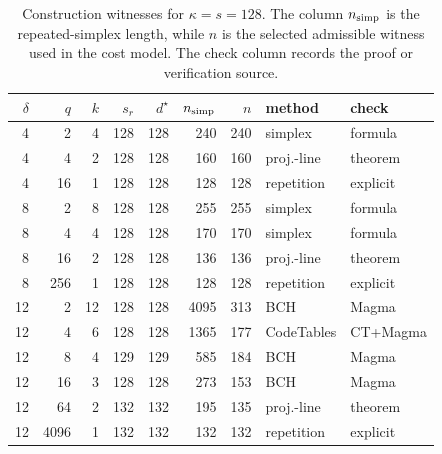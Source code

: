 \begin{table}
\centering
\small
\caption{Construction witnesses for $\kappa=s=128$. The column $n_{\rm simp}$ is the repeated-simplex length, while $n$ is the selected admissible witness used in the cost model. The check column records the proof or verification source.}
\label{tab:construction-witnesses}
\begingroup
\setlength{\tabcolsep}{3pt}
\begin{tabular}{rrrrrrrll}
\toprule
$\delta$ & $q$ & $k$ & $s_r$ & $d^\star$ & $n_{\rm simp}$ & $n$ & method & check \\
\midrule
4 & 2 & 4 & 128 & 128 & 240 & 240 & simplex & formula \\
4 & 4 & 2 & 128 & 128 & 160 & 160 & proj.-line & theorem \\
4 & 16 & 1 & 128 & 128 & 128 & 128 & repetition & explicit \\
8 & 2 & 8 & 128 & 128 & 255 & 255 & simplex & formula \\
8 & 4 & 4 & 128 & 128 & 170 & 170 & simplex & formula \\
8 & 16 & 2 & 128 & 128 & 136 & 136 & proj.-line & theorem \\
8 & 256 & 1 & 128 & 128 & 128 & 128 & repetition & explicit \\
12 & 2 & 12 & 128 & 128 & 4095 & 313 & BCH & Magma \\
12 & 4 & 6 & 128 & 128 & 1365 & 177 & CodeTables & CT+Magma \\
12 & 8 & 4 & 129 & 129 & 585 & 184 & BCH & Magma \\
12 & 16 & 3 & 128 & 128 & 273 & 153 & BCH & Magma \\
12 & 64 & 2 & 132 & 132 & 195 & 135 & proj.-line & theorem \\
12 & 4096 & 1 & 132 & 132 & 132 & 132 & repetition & explicit \\
\bottomrule
\end{tabular}
\endgroup
\end{table}
